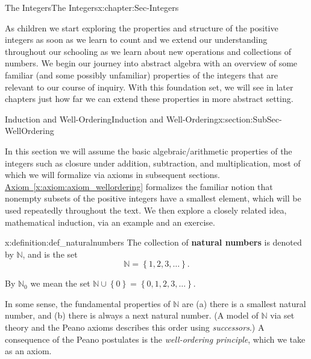 \documentclass[oneside,10pt,]{book}
\newcommand{\terminology}[1]{\textbf{#1}}
\numberwithin{equation}{section}
\newcommand{\set}[1]{\left\{ {#1} \right\}}
\def\N{{\mathbb N}}
\begin{document}
\renewcommand*\contentsname{Contents}
\tableofcontents
\mainmatter
%
%
\typeout{************************************************}
\typeout{************************************************}
%
\begin{chapterptx}{The Integers}{}{The Integers}{}{}{x:chapter:Sec-Integers}
\begin{introduction}{}%
As children we start exploring the properties and structure of the positive integers as soon as we learn to count and we extend our understanding throughout our schooling as we learn about new operations and collections of numbers. We begin our journey into abstract algebra with an overview of some familiar (and some possibly unfamiliar) properties of the integers that are relevant to our course of inquiry. With this foundation set, we will see in later chapters just how far we can extend these properties in more abstract setting.%
\end{introduction}%
%
%
\typeout{************************************************}
\typeout{************************************************}
%
\begin{sectionptx}{Induction and Well-Ordering}{}{Induction and Well-Ordering}{}{}{x:section:SubSec-WellOrdering}
\begin{introduction}{}%
In this section we will assume the basic algebraic\slash{}arithmetic properties of the integers such as closure under addition, subtraction, and multiplication, most of which we will formalize via axioms in subsequent sections. \hyperref[x:axiom:axiom_wellordering]{Axiom~\ref{x:axiom:axiom_wellordering}} formalizes the familiar notion that nonempty subsets of the positive integers have a smallest element, which will be used repeatedly throughout the text. We then explore a closely related idea, mathematical induction, via an example and an exercise.%
\end{introduction}%
\begin{definition}{}{x:definition:def_naturalnumbers}%
\index{\(\N\)} The collection of \terminology{natural numbers} is denoted by \(\N\), and is the set%
\begin{equation*}
\N = \set{1, 2, 3, \ldots}\text{.}
\end{equation*}
%
\par
By \(\N_0\) we mean the set \(\N\cup \set{0} = \set{0, 1, 2, 3, \ldots}\).%
\end{definition}
In some sense, the fundamental properties of \(\N\) are (a) there is a smallest natural number, and (b) there is always a next natural number. (A model of \(\N\) via set theory and the Peano axioms describes this order using \emph{successors}.) A consequence of the Peano postulates is the \emph{well-ordering principle}, which we take as an axiom.%

\end{sectionptx}
\end{chapterptx}
\end{document}
